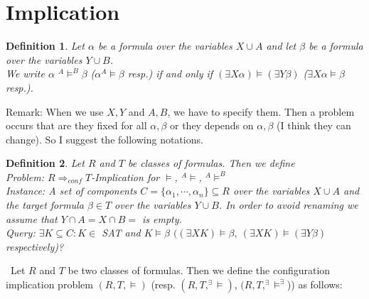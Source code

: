 \documentclass[12pt]{article}
\newcommand{\AMB}{\mbox{$^A$\hspace{-0.5mm}$\models^B$}}
\newcommand{\AM}{\mbox{$^A$\hspace{-0.5mm}$\models$}}
\newtheorem{definition}{Definition}[section]
\begin{document}
\section{Implication}
\begin{definition}
Let $\alpha$ be a formula over the variables $X \cup A$ and let $\beta$ be a formula over the variables $Y \cup B$.\\
We write $\alpha $ \AMB $\beta$ ($\alpha $\AM $\beta$ resp.) if and only if
$(\exists X \alpha) \models (\exists Y \beta)$ ($\exists X \alpha \models \beta$ resp.).
\end{definition}

\color{red}
\noindent Remark: When we use $X,Y$ and $A, B$, we have to specify them. Then a problem occurs that are they fixed for all $\alpha, \beta$ or they depends on $\alpha, \beta$ (I think they can change). So I suggest the following notations.\\


\color{black}


\begin{definition}
 Let $R$ and $T$ be classes of formulas. Then we define\\
{\em Problem:  $R \Longrightarrow_{conf} T$-Implication for $\models$, \AM, \AMB}\\
{\em Instance}: A set of components $C=\{\alpha_1,\cdots,\alpha_n\} \subseteq R$ over the variables $X \cup A$ and the target formula $\beta \in T$ over the variables $Y \cup B$. In order to avoid renaming we assume that $Y \cap A= X \cap B=$ is empty.\\
{\em Query}:
 $ \exists K \subseteq C: K \in$ SAT and $K \models \beta$ $((\exists X K)  \models \beta, \
(\exists X K) \models (\exists Y \beta)$ respectively)?\\
\end{definition}

\color{red}
\ Let $R$ and $T$ be two classes of formulas. Then we define the configuration implication problem
$(R, T, \models)$ (resp. $(R, T, ^\exists\!\models)$, $(R, T,^\exists\!\models^\exists$)) as follows:
\end{document}

